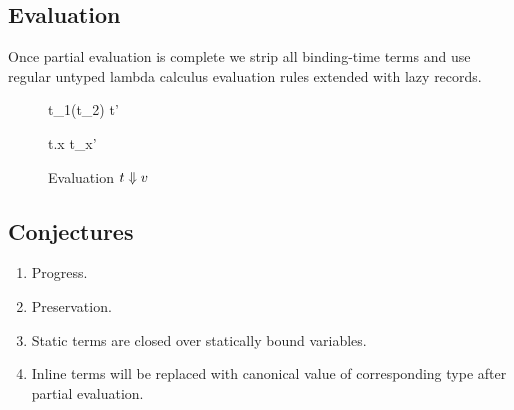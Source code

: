 \subsection{Evaluation}
Once partial evaluation is complete we strip all binding-time terms and use regular untyped
lambda calculus evaluation rules extended with lazy records.

\begin{figure}

  {t_1(t_2) \e t'}

  {t.x \e t_x'}
\caption{Evaluation $t \Downarrow v$}
\end{figure}

\subsection{Conjectures}

\begin{enumerate}
  \item Progress.
  \item Preservation.
  \item Static terms are closed over statically bound variables.
  \item Inline terms will be replaced with canonical value of corresponding type after partial evaluation.
\end{enumerate}

\clearpage
